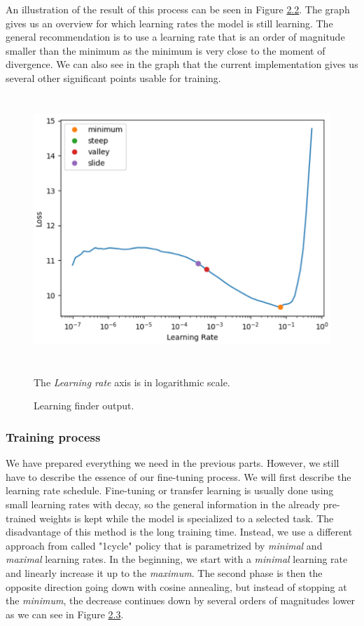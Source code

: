 An illustration of the result of this process can be seen in Figure \hyperref[fig02:lrFinder]{2.2}. The graph gives us an overview for which learning rates the model is still learning. The general recommendation is to use a learning rate that is an order of magnitude smaller than the minimum as the minimum is very close to the moment of divergence. We can also see in the graph that the current implementation gives us several other significant points usable for training.

\begin{figure}[h]\centering
\includegraphics[width=130mm, height=101mm]{../img/lrFinder}
\caption{Learning finder output.}
\label{fig02:lrFinder}
The \textit{Learning rate} axis is in logarithmic scale.
\end{figure}

\subsubsection*{Training process}
We have prepared everything we need in the previous parts. However, we still have to describe the essence of our fine-tuning process. We will first describe the learning rate schedule. Fine-tuning or transfer learning is usually done using small learning rates with decay, so the general information in the already pre-trained weights is kept while the model is specialized to a selected task. The disadvantage of this method is the long training time. Instead, we use a different approach from \citet{smith2018disciplined} called "1cycle" policy that is parametrized by \textit{minimal} and \textit{maximal} learning rates. In the beginning, we start with a \textit{minimal} learning rate and linearly increase it up to the \textit{maximum}. The second phase is then the opposite direction going down with cosine annealing, but instead of stopping at the \textit{minimum}, the decrease continues down by several orders of magnitudes lower as we can see in Figure \hyperref[fig03:lrSchedule]{2.3}. \\

